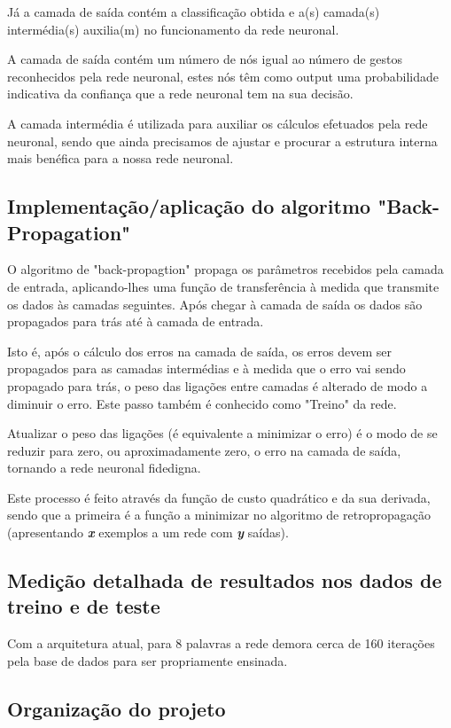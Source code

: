 \documentclass[10pt,a4paper]{article}
\begin{document}
Já a camada de saída contém a classificação obtida e a(s) camada(s) intermédia(s) auxilia(m) no funcionamento da rede neuronal.

A camada de saída contém um número de nós igual ao número de gestos reconhecidos pela rede neuronal, estes nós têm como output uma probabilidade indicativa da confiança que a rede neuronal tem na sua decisão.

A camada intermédia é utilizada para auxiliar os cálculos efetuados pela rede neuronal, sendo que ainda precisamos de ajustar e procurar a estrutura interna mais benéfica para a nossa rede neuronal.

\subsection{Implementação/aplicação do algoritmo "Back-Propagation"}
\subitem

O algoritmo de "back-propagtion" propaga os parâmetros recebidos pela camada de entrada, aplicando-lhes uma função de transferência à medida que transmite os dados às camadas seguintes. Após chegar à camada de saída os dados são propagados para trás até à camada de entrada.

Isto é, após o cálculo dos erros na camada de saída, os erros devem ser propagados para as camadas intermédias e à medida que o erro vai sendo propagado para trás, o peso das ligações entre camadas é alterado de modo a diminuir o erro. Este passo também é conhecido como "Treino" da rede.

Atualizar o peso das ligações (é equivalente a minimizar o erro) é o modo de se reduzir para zero, ou aproximadamente zero, o erro na camada de saída, tornando a rede neuronal fidedigna.

Este processo é feito através da função de custo quadrático e da sua derivada, sendo que a primeira é a função a minimizar no algoritmo de retropropagação (apresentando \textbf{\textit{x}} exemplos a um rede com \textbf{\textit{y}} saídas).


\subsection{Medição detalhada de resultados nos dados de treino e de teste}
\subitem

Com a arquitetura atual, para 8 palavras a rede demora cerca de 160 iterações pela base de dados para ser propriamente ensinada.

\subsection{Organização do projeto}
\subitem
\end{document}
